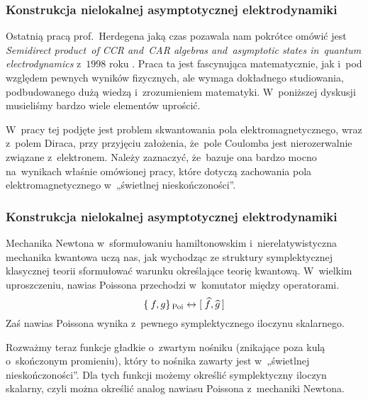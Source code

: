 \documentclass[10pt,t]{beamer}
\begin{document}
\begin{frame}
  \frametitle{Konstrukcja nielokalnej asymptotycznej
    elektrodynamiki}


  Ostatnią pracą prof.~Herdegena jaką czas pozawala nam pokrótce omówić
  jest 
  {\textit{Semidirect product~of CCR and~CAR algebras and~asymptotic states
      in~quantum electrodynamics}} z~$1998$ roku
  \parencite{Herdegen-Semidirect-product-of-CCR-and-CAR-algebras-ETC-Pub-1998}.
  Praca ta jest fascynująca matematycznie,
  jak i~pod względem pewnych wyników fizycznych, ale wymaga dokładnego
  studiowania, podbudowanego dużą wiedzą i~zrozumieniem matematyki.
  W~poniższej dyskusji musieliśmy bardzo wiele elementów uprościć.

  W~pracy tej podjęte jest problem skwantowania pola elektromagnetycznego,
  wraz z~polem Diraca, przy przyjęciu założenia, że~pole Coulomba jest
  nierozerwalnie związane z~elektronem. Należy zaznaczyć, że~bazuje ona
  bardzo mocno na~wynikach właśnie omówionej pracy, które dotyczą zachowania
  pola elektromagnetycznego w~„świetlnej nieskończoności”.

\end{frame}





\begin{frame}
  \frametitle{Konstrukcja nielokalnej asymptotycznej
    elektrodynamiki}


  Mechanika Newtona w~sformułowaniu hamiltonowskim i~nierelatywistyczna
  mechanika kwantowa uczą nas, jak wychodząc ze struktury symplektycznej
  klasycznej teorii sformułować warunku określające teorię kwantową.
  W~wielkim uproszczeniu, nawias Poissona przechodzi w~komutator między
  operatorami.
  \begin{equation}
    \label{eq:Wybrane-badania-ETC-01}
    \{ \hspace{0.22em} f, g \}_{ \, \text{Poi} } \leftrightarrow
    [ \hspace{0.25em} \widehat{ f }, \widehat{ g } \, ]
  \end{equation}
  Zaś nawias Poissona wynika z~pewnego symplektycznego iloczynu skalarnego.

  Rozważmy teraz funkcje gładkie o~zwartym nośniku (znikające poza kulą
  o~skończonym promieniu), który to nośnika zawarty jest  w~„świetlnej
  nieskończoności”. Dla tych funkcji możemy określić symplektyczny iloczyn
  skalarny, czyli można określić analog nawiasu Poissona z~mechaniki
  Newtona.

\end{frame}
\end{document}
